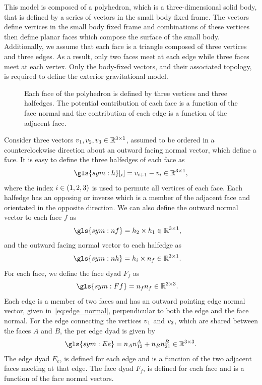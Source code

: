 This model is composed of a \gls{polyhedron}, which is a three-dimensional solid body, that is defined by a series of vectors in the small body fixed frame.
The vectors define vertices in the small body fixed frame and combinations of these vertices then define planar faces which compose the surface of the small body.
Additionally, we assume that each face is a triangle composed of three vertices and three edges.
As a result, only two faces meet at each edge while three faces meet at each vertex.
Only the body-fixed vectors, and their associated topology, is required to define the exterior gravitational model.

\begin{figure}[htbp]
    \centering
    
    \caption{Each face of the polyhedron is defined by three vertices and three halfedges.
    The potential contribution of each face is a function of the face normal and the contribution of each edge is a function of the adjacent face.\label{fig:polyhedron_face}}
\end{figure}
Consider three vectors \( v_1, v_2, v_3 \in \mathbb{R}^{3 \times 1} \), assumed to be ordered in a counterclockwise direction about an outward facing normal vector, which define a face.
It is easy to define the three halfedges of each face as
\begin{align}\label{eq:edges}
    \gls{sym:h}[_i] = \vc{v}_{i+1} - \vc{v}_i \in \R^{3 \times 1 },
\end{align}
where the index \( i \in \left( 1,2,3 \right) \) is used to permute all vertices of each face.
Each halfedge has an opposing or inverse which is a member of the adjacent face and orientated in the opposite direction.
We can also define the outward normal vector to each face \( f \) as
\begin{align}\label{eq:face_normal}
    \gls{sym:nf} &= \vc{h}_2 \times \vc{h}_1 \in \R^{3 \times 1},
\end{align}
and the outward facing normal vector to each halfedge as
\begin{align}\label{eq:edge_normal}
    \gls{sym:nh} &=  \vc{h}_i \times \vc{n}_f \in \R^{3 \times 1}.
\end{align}
For each face, we define the face dyad \( F_f \) as
\begin{align}\label{eq:face_dyad}
    \gls{sym:Ff} &= \vc{n}_f \vc{n}_f \in \R^{3 \times 3}.
\end{align}
Each edge is a member of two faces and has an outward pointing edge normal vector, given in~\cref{eq:edge_normal}, perpendicular to both the edge and the face normal.
For the edge connecting the vertices \( v_1 \) and \( v_2 \), which are shared between the faces \(A\) and \( B\), the per edge dyad is given by
\begin{align}\label{eq:edge_dyad}
    \gls{sym:Ee} = \vc{n}_A \vc{n}_{12}^A + \vc{n}_B \vc{n}_{21}^B \in \R^{3 \times 3}.
\end{align}
The edge dyad \( E_e  \), is defined for each edge and is a function of the two adjacent faces meeting at that edge.
The face dyad \( F_f \), is defined for each face and is a function of the face normal vectors.

